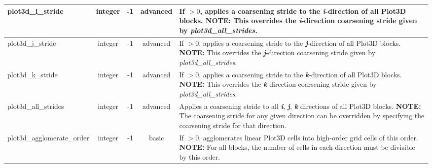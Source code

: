 \documentclass[letterpaper,10pt]{article}
\newcommand{\slbsc}{basic}
\newcommand{\sladv}{advanced}
\newcommand{\typint}{integer}
\newcommand{\minorline}{\hline}
\newcommand{\groupline}[1]{}
\newlength{\colEwidth}
\newcommand{\descriptionbegin}{}
\newcommand{\descriptionend}{\\ \minorline}
\newcommand{\NOTE}{\newline \textcolor{OrangeRed3}{\textbf{NOTE: }}}
\begin{document}
\begin{longtable}{ | l | c | c | c | p{\colEwidth} | }
    \groupline{PLOT3D COARSENING OPTIONS}
    plot3d\_i\_stride          & \typint & -1 & \sladv &
    \descriptionbegin
    If $> 0$, applies a coarsening stride to the \textit{\textbf{i}}-direction
    of all Plot3D blocks. 
    \NOTE This overrides the \textit{\textbf{i}}-direction coarsening
    stride given by \textsl{plot3d\_all\_strides}.
    \descriptionend
    plot3d\_j\_stride          & \typint & -1 & \sladv &
    \descriptionbegin
    If $> 0$, applies a coarsening stride to the \textit{\textbf{j}}-direction
    of all Plot3D blocks. 
    \NOTE This overrides the \textit{\textbf{j}}-direction coarsening
    stride given by \textsl{plot3d\_all\_strides}.
    \descriptionend
    plot3d\_k\_stride          & \typint & -1 & \sladv &
    \descriptionbegin
    If $> 0$, applies a coarsening stride to the \textit{\textbf{k}}-direction
    of all Plot3D blocks. 
    \NOTE This overrides the \textit{\textbf{k}}-direction coarsening
    stride given by \textsl{plot3d\_all\_strides}.
    \descriptionend
    plot3d\_all\_strides       & \typint & -1 & \sladv &
    \descriptionbegin
    Applies a coarsening stride to all \textit{\textbf{i}}, \textit{\textbf{j}},
    \textit{\textbf{k}} directions of all Plot3D blocks. 
    \NOTE The coarsening stride for any given direction can be
    overridden by specifying the coarsening stride for that direction.
    \descriptionend
    plot3d\_agglomerate\_order & \typint & -1 & \slbsc &
    \descriptionbegin
    If $> 0$, agglomerates linear Plot3D cells into high-order grid cells of
    this order. 
    \NOTE For all blocks, the number of cells in each direction must be
    divisible by this order.
    \descriptionend


\end{longtable}
\end{document}
